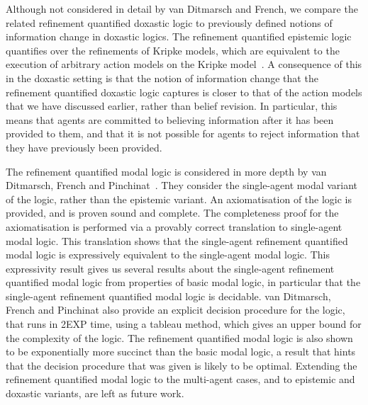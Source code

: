 Although not considered in detail by van Ditmarsch and French, we compare the
related refinement quantified doxastic logic to previously defined notions of
information change in doxastic logics. The refinement quantified epistemic logic
quantifies over the refinements of Kripke models, which are equivalent to the
execution of arbitrary action models on the Kripke
model~\cite{french2009simulation}. A consequence of this in the doxastic setting
is that the notion of information change that the refinement quantified doxastic
logic captures is closer to that of the action models that we have discussed
earlier, rather than belief revision. In particular, this means that agents are
committed to believing information after it has been provided to them, and that
it is not possible for agents to reject information that they have previously
been provided.

The refinement quantified modal logic is considered in more depth by van
Ditmarsch, French and Pinchinat~\cite{french2010future}. They consider the
single-agent modal variant of the logic, rather than the epistemic variant. An
axiomatisation of the logic is provided, and is proven sound and complete. The
completeness proof for the axiomatisation is performed via a provably correct
translation to single-agent modal logic. This translation shows that the
single-agent refinement quantified modal logic is expressively equivalent to the
single-agent modal logic. This expressivity result gives us several results
about the single-agent refinement quantified modal logic from properties of
basic modal logic, in particular that the single-agent refinement quantified
modal logic is decidable. van Ditmarsch, French and Pinchinat also provide an
explicit decision procedure for the logic, that runs in 2EXP time, using a
tableau method, which gives an upper bound for the complexity of the logic. The
refinement quantified modal logic is also shown to be exponentially more
succinct than the basic modal logic, a result that hints that the decision
procedure that was given is likely to be optimal. Extending the refinement
quantified modal logic to the multi-agent cases, and to epistemic and doxastic
variants, are left as future work.
